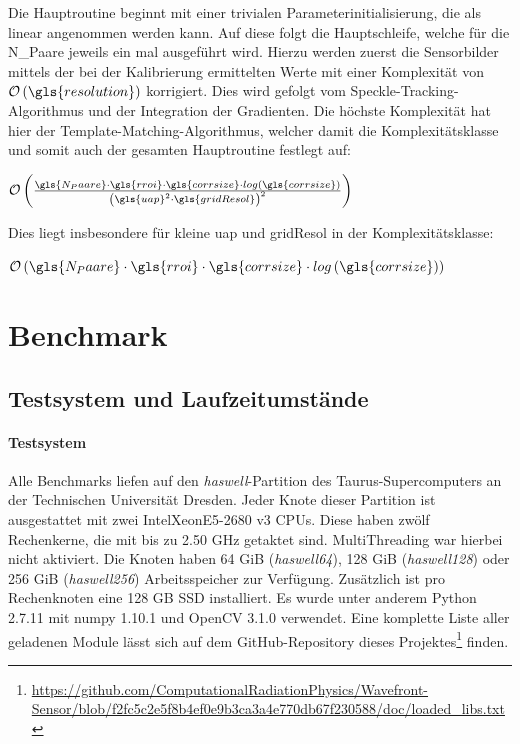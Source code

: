 Die Hauptroutine beginnt mit einer trivialen Parameterinitialisierung, die als linear angenommen werden kann. Auf diese folgt die Hauptschleife, welche für die \gls{N_Paare} jeweils ein mal ausgeführt wird. Hierzu werden zuerst die Sensorbilder mittels der bei der Kalibrierung ermittelten Werte mit einer Komplexität von $\mathcal{O}\left(\gls{resolution}\right)$ korrigiert. Dies wird gefolgt vom Speckle-Tracking-Algorithmus und der Integration der Gradienten. Die höchste Komplexität hat hier der Template-Matching-Algorithmus, welcher damit die Komplexitätsklasse und somit auch der gesamten Hauptroutine festlegt auf:

\begin{center}
	$\mathcal{O}\left(\frac{\gls{N_Paare} \cdot\gls{rroi} \cdot \gls{corrsize} \cdot log\left(\gls{corrsize}\right)}{\left(\gls{uap}^2 \cdot \gls{gridResol}\right)^2}\right)$
\end{center}

Dies liegt insbesondere für kleine \gls{uap} und \gls{gridResol} in der Komplexitätsklasse:

\begin{center}
	$\mathcal{O}\left(\gls{N_Paare} \cdot\gls{rroi} \cdot \gls{corrsize} \cdot log\left(\gls{corrsize}\right)\right)$
\end{center}

\section{Benchmark}

\subsection{Testsystem und Laufzeitumstände}

\paragraph{Testsystem}

Alle Benchmarks liefen auf den \textit{haswell}-Partition des Taurus-Supercomputers an der Technischen Universität Dresden. Jeder Knote dieser Partition ist ausgestattet mit zwei Intel\textregistered Xeon\textregistered E5-2680 v3 \glspl{CPU}. Diese haben zwölf Rechenkerne, die mit bis zu 2.50 \gls{GHz} getaktet sind. MultiThreading war hierbei nicht aktiviert. Die Knoten haben 64 \gls{GiB} (\textit{haswell64}), 128 \gls{GiB} (\textit{haswell128}) oder 256 \gls{GiB} (\textit{haswell256}) Arbeitsspeicher zur Verfügung. Zusätzlich ist pro Rechenknoten eine 128 \gls{GB} \gls{SSD} installiert. Es wurde unter anderem Python 2.7.11 mit numpy 1.10.1 und OpenCV 3.1.0 verwendet. Eine komplette Liste aller geladenen Module lässt sich auf dem GitHub-Repository dieses Projektes\footnote{\url{https://github.com/ComputationalRadiationPhysics/Wavefront-Sensor/blob/f2fc5c2e5f8b4ef0e9b3ca3a4e770db67f230588/doc/loaded_libs.txt}} finden.

